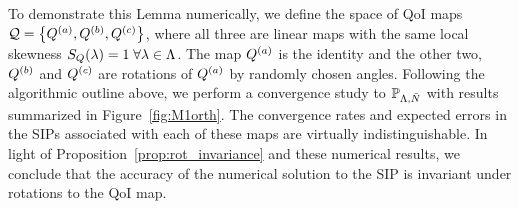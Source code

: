 To demonstrate this Lemma numerically, we define the space of QoI maps $\mathcal{Q} = \left\{ Q^{(a)} , Q^{(b)}, Q^{(c)} \right\}$, where all three are linear maps with the same local skewness $S_Q (\lambda) = 1 \; \forall \lambda \in {\Lambda}$.
The map $Q^{(a)}$ is the identity and the other two, $Q^{(b)}$ and $Q^{(c)}$ are rotations of $Q^{(a)}$ by randomly chosen angles.
Following the algorithmic outline above, we perform a convergence study to $\mathbb{P}_{{\Lambda},\bar{N}}$ with results summarized in Figure~\ref{fig:M1orth}.
The convergence rates and expected errors in the SIPs associated with each of these maps are virtually indistinguishable.
In light of Proposition~\ref{prop:rot_invariance} and these numerical results, we conclude that the accuracy of the numerical solution to the SIP is invariant under rotations to the QoI map.

\FloatBarrier
